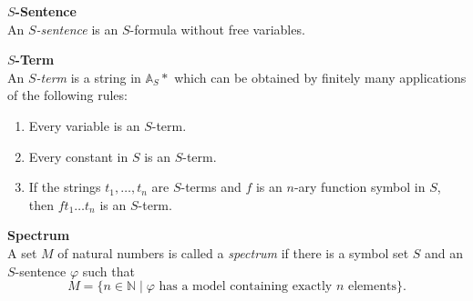 \documentclass{fank1basedocument}
\begin{document}
\vspace{1em}

{\large\textbf{$S$-Sentence}}\\
An \textit{$S$-sentence} is an $S$-formula without free variables.

\vspace{1em}

{\large\textbf{$S$-Term}}\\
An \textit{$S$-term} is a string in $\mathbb{A}_S*$ which can be obtained by finitely many applications of the following rules:
\begin{enumerate}[label={(T\arabic*)}]
	\item Every variable is an $S$-term.
	\item Every constant in $S$ is an $S$-term.
	\item If the strings $t_1,\dots,t_n$ are $S$-terms and $f$ is an $n$-ary function symbol in $S$, then $ft_1\dots t_n$ is an $S$-term.
\end{enumerate}

\vspace{1em}

{\large\textbf{Spectrum}}\\
A set $M$ of natural numbers is called a \textit{spectrum} if there is a symbol set $S$ and an $S$-sentence $\varphi$ such that
\[M=\{n\in \mathbb{N}\mid\varphi\text{ has a model containing exactly $n$ elements}\}.\]
\end{document}
